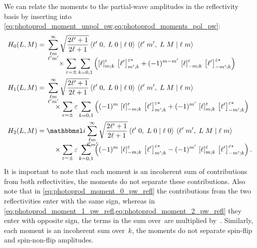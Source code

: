 We can relate the moments to the partial-wave amplitudes in the
reflectivity basis by inserting
 into
\cref{eq:photoprod_moment_unpol_pw,eq:photoprod_moments_pol_pw}:
\begin{align}
  \label{eq:photoprod_moment_0_pw_refl}
  H_0(L, M)
  ={}& \begin{multlined}[t][0.8\columnwidth]
    \sum_{\substack{\ell m \\ \ell' m'}}^\infty \sqrt{\frac{2 \ell' + 1}{2 \ell + 1}}
    \clebsch{\ell'}{0}{L}{0}{\ell}{0}\, \clebsch{\ell'}{m'}{L}{M}{\ell}{m}
    \\[-2ex]
    \shoveleft{\hfill \times%
      \sum_{\refl = \pm} \sum_{k = 0, 1} \rBrk[2]{\sBrk{\ell}^\refl_{m; k}\, \sBrk{\ell'}^{\refl *}_{m'; k}
      + (-1)^{m - m'}\, \sBrk{\ell}^\refl_{{-m}; k}\, \sBrk{\ell'}^{\refl *}_{{-m'}; k}}
    }\phantom{.}
  \end{multlined}
  \\
  \label{eq:photoprod_moment_1_pw_refl}
  H_1(L, M)
  ={}& \begin{multlined}[t][0.8\columnwidth]
    \sum_{\substack{\ell m \\ \ell' m'}}^\infty \sqrt{\frac{2 \ell' + 1}{2 \ell + 1}}
    \clebsch{\ell'}{0}{L}{0}{\ell}{0}\, \clebsch{\ell'}{m'}{L}{M}{\ell}{m}
    \\[-2ex]
    \shoveleft{\hfill \times%
      \sum_{\refl = \pm} \refl \sum_{k = 0, 1} \rBrk[2]{(-1)^m\, \sBrk{\ell}^\refl_{{-m}; k}\, \sBrk{\ell'}^{\refl *}_{m'; k}
      + (-1)^{m'}\, \sBrk{\ell}^\refl_{m; k}\, \sBrk{\ell'}^{\refl *}_{{-m'}; k}}
    }\phantom{.}
  \end{multlined}
  \\
  \label{eq:photoprod_moment_2_pw_refl}
  H_2(L, M)
  ={}& \begin{multlined}[t][0.8\columnwidth]
    \imag \sum_{\substack{\ell m \\ \ell' m'}}^\infty \sqrt{\frac{2 \ell' + 1}{2 \ell + 1}}
    \clebsch{\ell'}{0}{L}{0}{\ell}{0}\, \clebsch{\ell'}{m'}{L}{M}{\ell}{m}
    \\[-2ex]
    \shoveleft{\hfill \times%
      \sum_{\refl = \pm} \refl \sum_{k = 0, 1} \rBrk[2]{(-1)^m\, \sBrk{\ell}^\refl_{{-m}; k}\, \sBrk{\ell'}^{\refl *}_{m'; k}
      - (-1)^{m'}\, \sBrk{\ell}^\refl_{m; k}\, \sBrk{\ell'}^{\refl *}_{{-m'}; k}}
    }.
  \end{multlined}
\end{align}
It is important to note that each moment is an incoherent sum of
contributions from both reflectivities, \ie the moments do not
separate these contributions.  Also note that in
\cref{eq:photoprod_moment_0_pw_refl} the contributions from the two
reflectivities enter with the same sign, whereas in
\cref{eq:photoprod_moment_1_pw_refl,eq:photoprod_moment_2_pw_refl}
they enter with opposite sign, \ie the terms in the sum over~ are
multiplied by~.  Similarly, each moment is an incoherent sum
over~$k$, \ie the moments do not separate spin-flip and spin-non-flip
amplitudes.

